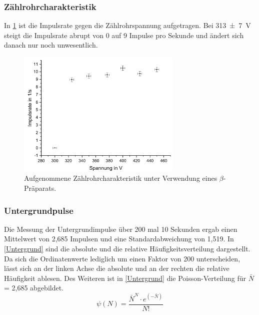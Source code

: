 \documentclass[
	a4paper,
	12pt,
	pagesize,
	ngerman
]{scrartcl}
\begin{document}
	\subsubsection{Zählrohrcharakteristik}
	In \cref{Zaehlrohrcharakteristik} ist die Impulsrate gegen die Zählrohrspannung aufgetragen.
	Bei \SI{313+-7}{\volt} steigt die Impulsrate abrupt von 0 auf 9 Impulse pro Sekunde und ändert sich danach nur noch unwesentlich. 
	
	
	\begin{figure}[H]
		\includegraphics[width=0.7\textwidth]{Zaehlrohrcharakteristik}
		\centering
		\caption{Aufgenommene Zählrohrcharakteristik unter Verwendung eines $\beta$-Präparats.}%
		\label{Zaehlrohrcharakteristik}
		\centering
	\end{figure}
	
	\subsubsection{Untergrundpulse}
	Die Messung der Untergrundimpulse über 200 mal 10 Sekunden ergab einen Mittelwert von 2,685 Impulsen und eine Standardabweichung von 1,519. 
	In \cref{Untergrund} sind die absolute und die relative Häufigkeitsverteilung dargestellt.
	Da sich die Ordinatenwerte lediglich um einen Faktor von 200 unterscheiden, lässt sich an der linken Achse die absolute und an der rechten die relative Häufigkeit ablesen.
	Des Weiteren ist in \cref{Untergrund} die Poisson-Verteilung für $\bar{N}$ = 2,685 abgebildet.
	\begin{equation}
		\psi(N) = \frac{\bar{N}^N \cdot e^{(-\bar{N})}}{N!}
	\label{Poisson}
	\end{equation}
	
\end{document}
